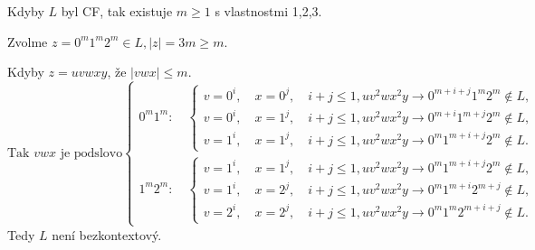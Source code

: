 Kdyby $L$ byl CF, tak existuje $m \geq 1$ s vlastnostmi 1,2,3.

Zvolme $z = 0^m 1^m 2^m \in L, |z| = 3m \geq m$.

Kdyby $z = uvwxy$, že $|vwx| \leq m$. 
\[
\text{Tak $vwx$ je podslovo}
\begin{cases}
    0^m 1^m:\quad 
      \begin{cases}
        v = 0^i,\quad x = 0^j,\quad i+j \leq 1, uv^2wx^2y \rightarrow 0^{m+i+j}1^m2^m \not\in L, \\[1ex]
        v = 0^i,\quad x = 1^j,\quad i+j \leq 1, uv^2wx^2y \rightarrow 0^{m+i}1^{m+j}2^m \not\in L, \\[1ex]
        v = 1^i,\quad x = 1^j,\quad i+j \leq 1, uv^2wx^2y \rightarrow 0^{m}1^{m+i+j}2^m \not\in L.
      \end{cases}
    \\[2ex]
    1^m 2^m:\quad 
      \begin{cases}
        v = 1^i,\quad x = 1^j,\quad i+j \leq 1, uv^2wx^2y \rightarrow 0^{m}1^{m+i+j}2^m \not\in L, \\[1ex]
        v = 1^i,\quad x = 2^j,\quad i+j \leq 1, uv^2wx^2y \rightarrow 0^{m}1^{m+i}2^{m+j} \not\in L, \\[1ex]
        v = 2^i,\quad x = 2^j,\quad i+j \leq 1, uv^2wx^2y \rightarrow 0^{m}1^{m}2^{m+i+j} \not\in L.
      \end{cases}
\end{cases}
\]
Tedy $L$ není bezkontextový.